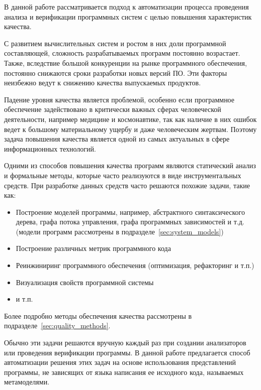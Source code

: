 \intro


В данной работе рассматривается подход к автоматизации процесса проведения
анализа и верификации программных систем с целью повышения характеристик
качества.

С развитием вычислительных систем и ростом в них доли программной составляющей,
сложность разрабатываемых программ постоянно возрастает. Также, вследствие
большой конкуренции на рынке программного обеспечения, постоянно снижаются сроки
разработки новых версий ПО. Эти факторы неизбежно ведут к снижению качества
выпускаемых продуктов.

Падение уровня качества является проблемой, особенно если программное
обеспечение задействовано в критически важных сферах человеческой деятельности,
например медицине и космонавтике, так как наличие в них ошибок ведет к большому
материальному ущербу и даже человеческим жертвам. Поэтому задача повышения
качества является одной из самых актуальных в сфере информационных технологий.

Одними из способов повышения качества программ являются статический анализ и
формальные методы, которые часто реализуются в виде инструментальных
средств. При разработке данных средств часто решаются похожие задачи, такие
как:
\begin{itemize}
    \item Построение моделей программы, например, абстрактного синтаксического
    дерева, графа потока управления, графа программных зависимостей и т.д.
    (модели программ рассмотрены в подразделе~\ref{sec:system_models})
    \item Построение различных метрик программного кода
    \item Реинжиниринг программного обеспечения (оптимизация, рефакторинг и т.п.)
    \item Визуализация свойств программной системы
    \item и т.п.
\end{itemize}

Более подробно методы обеспечения качества рассмотрены в
подразделе~\ref{sec:quality_methods}.

Обычно эти задачи решаются вручную каждый раз при создании анализаторов или
проведения верификации программы. В данной работе предлагается способ
автоматизации решения этих задач на основе использования представлений
программы, не зависящих от языка написания ее исходного кода, называемых
метамоделями.
